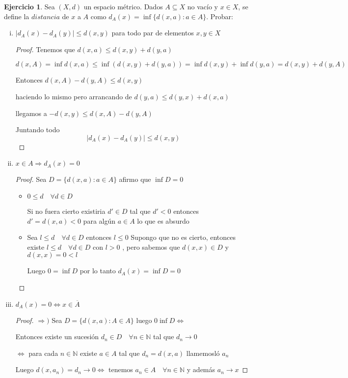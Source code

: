 \documentclass[12pt]{report}
\newcommand{\N}{\mathbb{N}}
\newcommand{\Ra}{\Rightarrow}
\newcommand{\ra}{\rightarrow}
\newcommand{\ol}{\overline}
\theoremstyle{definition}
\newtheorem{ej}{Ejercicio}
\begin{document}
\begin{ej}
  Sea $(X,d)$ un espacio métrico. Dados $A \subseteq X$ no vacío y $x \in X$, se define la $distancia$ de $x$ a $A$ como $d_A(x) = \inf{\{d(x,a):a\in A \}}$. Probar:
  \begin{enumerate}[i.]
    \item $|d_A(x) - d_A(y)| \leq d(x,y)$ para todo par de elementos $x,y \in X$
      \begin{proof}
	Tenemos que $d(x,a) \leq d(x,y) + d(y,a)$ 

	$d(x,A)  = \inf d(x,a) \leq \inf (d(x,y) + d(y,a)) = \inf d(x,y) + \inf d(y,a) = d(x,y) + d(y,A)$

	Entonces $d(x,A) - d(y,A) \leq d(x,y)$

	haciendo lo mismo pero arrancando de $d(y,a) \leq d(y,x) + d(x,a)$

	llegamos a $- d(x,y) \leq d(x,A) - d(y,A)$

	Juntando todo
	$$ |d_A(x) - d_A(y) | \leq d(x,y) $$
      \end{proof} 
    \item $x \in A \Ra d_A(x)=0$
      \begin{proof}
	Sea $D = \{d(x,a) : a \in A\}$ afirmo que $\inf D = 0$
	\begin{itemize}
	  \item $0 \leq d \quad \forall d \in D$ 

	    Si no fuera cierto existiria $d' \in D$ tal que $d' < 0$ entonces $d' = d(x,a) < 0$ para algún $a \in A$ lo que es absurdo
	  \item Sea $l \leq d \quad \forall d \in D $ entonces $l \leq 0$ Supongo que no es cierto, entonces existe $l \leq d \quad \forall d \in D$ con $l > 0$ , pero sabemos que $d(x,x) \in D$ y $d(x,x) = 0 < l$

	    Luego $0 = \inf D$ por lo tanto $d_{A}(x) = \inf D = 0$ 
	  \end{itemize}
	  \end{proof}
	  \newpage
	\item $d_A(x) = 0 \iff x \in \ol A$
	  \begin{proof}
	  $\Ra )$ Sea $D = \{d(x,a):A\in A\}$ luego $0 \inf D \iff$ 

	    Entonces existe un sucesión $d_n \in D \quad \forall n \in \N$ tal que $d_n \ra 0$

	    $\iff$ para cada $n \in \N$  existe $a \in A$ tal que $d_n = d(x,a)$ llamemosló $a_n$ 

	    Luego $d(x,a_n)= d_n \ra 0 \iff$ tenemos $a_n \in A \quad \forall n \in \N$ y además $a_n \ra x$


\end{proof}
\end{enumerate}
\end{ej}
\end{document}
